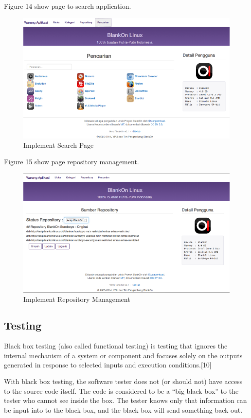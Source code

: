 \documentclass[conference, letterpaper]{IEEEtran}
\begin{document}
Figure 14 show page to search application.
\begin{figure}[!t]
\centering
\includegraphics[scale=0.31]{image/03HamalanPencarian.png}
\caption{Implement Search Page}
\end{figure}

Figure 15 show page repository management.
\begin{figure}[!t]
\centering
\includegraphics[scale=0.31]{image/02HalamanRepository.png}
\caption{Implement Repository Management}
\end{figure}

\subsection{Testing}
Black box testing (also called functional testing) is testing that ignores the internal mechanism of a system or component and focuses solely on the outputs generated in response to selected inputs and execution conditions.[10]

With black box testing, the software tester does not (or should not) have access to the source code itself. The code is considered to be a “big black box” to the tester who cannot see inside the box. The tester knows only that information can be input into to the black box, and the black box will send something back out.
\end{document}
